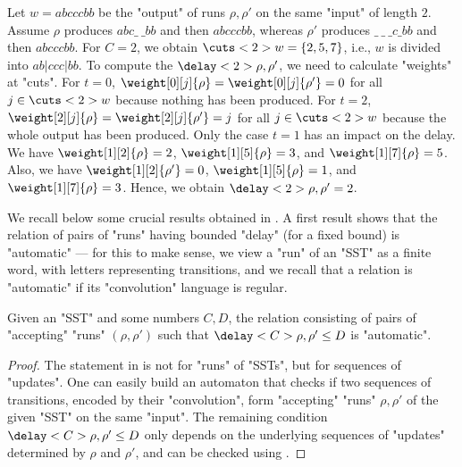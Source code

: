 \documentclass{theoretics}
\begin{document}
\begin{example}\label{ex:delay}
Let $w = abcccbb$ be the "output" of runs $\rho, \rho'$ 
on the same "input" of length $2$. 
Assume $\rho$ produces $abc\_\ \_bb$ and then $abcccbb$, 
whereas $\rho'$ produces $\_\ \_\ \_c\_bb$ and then $abcccbb$.
For $C = 2$, we obtain $\cuts<2>{w} = \{2,5,7\}$, i.e., $w$ is divided into $ab|ccc|bb$.
To compute the $\delay<2>{\rho,\rho'}$, we need to calculate "weights"
at "cuts". For $t=0$, $\weight[0][j]{\rho} =
\weight[0][j]{\rho'} = 0$ for all $j\in \cuts<2>{w}$ because nothing
has been produced. For $t=2$, $\weight[2][j]{\rho} =
\weight[2][j]{\rho'} = j$ for all $j\in \cuts<2>{w}$ because the whole output
has been produced. Only the case $t=1$ has an impact on the delay. 
We have $\weight[1][2]{\rho} = 2$, $\weight[1][5]{\rho} = 3$, and $\weight[1][7]{\rho} = 5$.
Also, we have $\weight[1][2]{\rho'} = 0$, $\weight[1][5]{\rho} = 1$, and $\weight[1][7]{\rho} = 3$.
Hence, we obtain $\delay<2>{\rho,\rho'} = 2$. 
\end{example}

We recall below some crucial results obtained in \cite{SSTdelay}.
A first result shows that the relation of pairs of "runs" 
having bounded "delay" (for a fixed bound) is "automatic"
--- for this to make sense, we view a "run" of an "SST"
as a finite word, with letters representing transitions, 
and we recall that a relation is "automatic" 
if its "convolution" language is regular.


\begin{lemma}\label{lem:regular-delay}
Given an "SST" and some numbers $C,D$, the relation consisting of
pairs of "accepting" "runs" $(\rho,\rho')$ such that $\delay<C>{\rho,\rho'} \le D$ 
is "automatic".
\end{lemma}

\begin{proof}
The statement in \cite[Theorem 5]{SSTdelay} is not for "runs" of "SSTs",
but for sequences of "updates". One can easily build an automaton 
that checks if two sequences of transitions, encoded by their "convolution",
form "accepting" "runs" $\rho,\rho'$ of the given "SST" on the same "input". 
The remaining condition $\delay<C>{\rho,\rho'} \le D$ only depends on 
the underlying sequences of "updates" determined by $\rho$ and $\rho'$,
and can be checked using \cite[Theorem 5]{SSTdelay}.
\end{proof}
\end{document}
